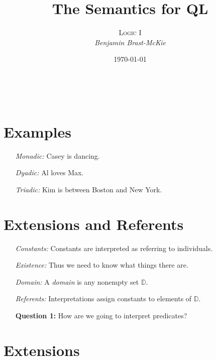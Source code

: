 \documentclass[a4paper, 11pt]{article} %
\title{\textbf{The Semantics for QL}} %
\author{\textsc{Logic I}\\ \em Benjamin Brast-McKie} %
\date{\today} %
\makeatletter
\newcommand{\D}{\mathbb{D}}
\renewcommand{\maketitle}{ %
\begin{flushright} %
{\LARGE\@title} %

\vspace{10pt} %

{\@author} %
\\\@date %

\vspace{30pt} %
\end{flushright}
}
\makeatother
\begin{document}
\maketitle %

\thispagestyle{empty}


\section*{Examples}%
  \label{sec:Examples}
  
\begin{enumerate}
  \item[\it Monadic:] Casey is dancing.
  \item[\it Dyadic:] Al loves Max.
  \item[\it Triadic:] Kim is between Boston and New York.
\end{enumerate}

\section*{Extensions and Referents}%
  \label{sec:Extensions and Referents}
  
\begin{enumerate}
  \item[\it Constants:] Constants are interpreted as referring to individuals.
  \item[\it Existence:] Thus we need to know what things there are.
  \item[\it Domain:] A \textit{domain} is any nonempty set $\D$.
  \item[\it Referents:] Interpretations assign constants to elements of $\D$.
  \item[\bf Question 1:] How are we going to interpret predicates?
\end{enumerate}



\section*{Extensions}%
  \label{sec:Extensions}
  
\end{document}
